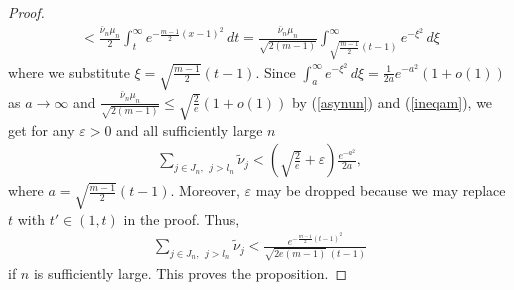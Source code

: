 \documentclass[10pt]{amsart}
\theoremstyle{remark}
\let\td=\tilde
\begin{document}
\begin{proof}
\begin{eqnarray*}
<\frac{\bar\nu_n\mu_n}{2}\int_t^\infty
e^{-\frac{m-1}{2}(x-1)^2}\,dt
=\frac{\bar\nu_n\mu_n}{\sqrt{2(m-1)}}
\int_{\sqrt{\frac{m-1}{2}}(t-1)}^\infty e^{-\xi^2}\,d\xi
\end{eqnarray*}
where we substitute $\xi=\sqrt{\frac{m-1}{2}}(t-1)$. Since
$\int_a^\infty e^{-\xi^2}\,d\xi=\frac{1}{2a}e^{-a^2}(1+o(1))$ as
$a\to\infty$ and
$\frac{\bar\nu_n\mu_n}{\sqrt{2(m-1)}}\leq\sqrt{\frac{2}{e}}(1+o(1))$
by (\ref{asynun}) and (\ref{ineqam}), we get for any ${{\mathord{\varepsilon}}}>0$ and
all sufficiently large $n$
\begin{eqnarray*}
\sum\limits_{j\in J_n,~~j>l_n}\td\nu_j
<\left(\sqrt{\frac{2}{e}}+{{\mathord{\varepsilon}}}\right)\frac{e^{-a^2}}{2a},
\end{eqnarray*}
where $a=\sqrt{\frac{m-1}{2}}(t-1)$. Moreover, ${{\mathord{\varepsilon}}}$ may be
dropped because we may replace $t$ with $t'\in(1,t)$ in the proof.
Thus,
\begin{eqnarray*}
\sum\limits_{j\in J_n,~~j>l_n}\td\nu_j <
\frac{e^{-\frac{m-1}{2}(t-1)^2}}{\sqrt{2e(m-1)}\,(t-1)}
\end{eqnarray*}
if $n$ is sufficiently large. This proves the proposition.
\end{proof}
\end{document}
